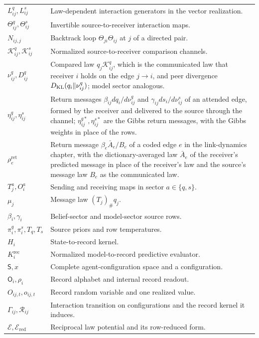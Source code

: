 \begin{longtable}{@{}p{}p{}@{}}
$L^q_{ij},L^s_{ij}$ & Law-dependent interaction generators in the vector realization. \\
$\Theta^q_{ij},\Theta^s_{ij}$ & Invertible source-to-receiver interaction maps. \\
$N_{ij,j}$ & Backtrack loop $\Theta_{ji}\Theta_{ij}$ at $j$ of a directed pair. \\
$\mathcal K^q_{ij},\mathcal K^s_{ij}$ & Normalized source-to-receiver comparison channels. \\
$\nu^q_{ij},D^q_{ij}$ & Compared law $q_j\mathcal K^q_{ij}$, which is the communicated law that receiver $i$ holds on the edge $j\to i$, and peer divergence $D_{\mathrm{KL}}(q_i\Vert\nu^q_{ij})$; model sector analogous. \\
$\eta^q_{ij},\eta^s_{ij}$ & Return messages $\beta_{ij}dq_i/d\nu^q_{ij}$ and $\gamma_{ij}ds_i/d\nu^s_{ij}$ of an attended edge, formed by the receiver and delivered to the source through the channel; $\eta^{q*}_{ij},\eta^{s*}_{ij}$ are the Gibbs return messages, with the Gibbs weights in place of the rows. \\
$\rho_e^{\mathrm{ret}}$ & Return message $\beta_e\bar A_e/B_e$ of a coded edge $e$ in the link-dynamics chapter, with the dictionary-averaged law $\bar A_e$ of the receiver's predicted message in place of the receiver's law and the source's message law $B_e$ as the communicated law. \\
$T_j^a,O_i^a$ & Sending and receiving maps in sector $a\in\{q,s\}$. \\
$\mu_j$ & Message law $(T_j)_\#q_j$. \\
$\beta_i,\gamma_i$ & Belief-sector and model-sector source rows. \\
$\pi^q_i,\pi^s_i,T_q,T_s$ & Source priors and row temperatures. \\
$H_i$ & State-to-record kernel. \\
$K_i^{\mathrm{rec}}$ & Normalized model-to-record predictive evaluator. \\
$\mathsf S,x$ & Complete agent-configuration space and a configuration. \\
$\mathsf O_i,\rho_i$ & Record alphabet and internal record readout. \\
$O_{ij,t},o_{ij,t}$ & Record random variable and one realized value. \\
$\Gamma_{ij},\mathcal R_{ij}$ & Interaction transition on configurations and the record kernel it induces. \\
$\mathcal E,\mathcal E_{\mathrm{red}}$ & Reciprocal law potential and its row-reduced form. \\

\end{longtable}
